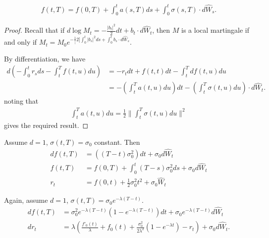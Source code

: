 \begin{remark}
  \begin{align}
    \label{eq:158}
    f(t, T) = f(0, T) + \int_{0}^{t} a(s, T) ds + \int_{0}^{t}
    \sigma(s, T) \cdot d\hat W_{s}.
  \end{align}
\end{remark}

\begin{proof}
  Recall that if $d \log M_{t} = -\frac{|b_{t}|^{2}}{2} dt + b_{t}
  \cdot d \hat W_{t}$, then $M$ is a local martingale if and only if
  $M_{t} = M_{0} e^{-\frac{1}[2] \int_{0}^{t} |b_{s}|^{2} ds +
    \int_{0}^{t} b_{s} \cdot d \hat W_{s}}$.

  By differentiation, we have
  \begin{align}
    \label{eq:159}
    d \left( - \int_{0}^{t} r_{s} ds - \int_{t}^{T} f(t, u) du \right)
    &=
    -r_{t} dt + f(t, t) dt - \int_{t}^{T} df(t, u) du \\
    &= - (\int_{t}^{T} a(t, u) du) dt - (\int_{t}^{T} \sigma(t, u) du)
    \cdot d \hat W_{t}.
  \end{align}
  noting that
  \begin{align}
    \label{eq:160}
    \int_{t}^{T} a(t, u) du = \frac{1}{2} \| \int_{t}^{T} \sigma(t, u)
    du \|^{2} 
  \end{align} gives the required result.
\end{proof}

\begin{exmp}
  \label{defn:bond_markets:8}
  Assume $d = 1$, $\sigma(t, T) = \sigma_{0}$ constant. Then
  \begin{align}
    \label{eq:161}
    df(t, T) &= ((T - t) \sigma_{0}^{2}) dt + \sigma_{0} d \hat W_{t}
    \\
    f(t, T) &= f(0, T) + \int_{0}^{t} (T - s) \sigma_{0}^{2} ds +
    \sigma_{0} d \hat W_{t} \\
    r_{t} &= f(0, t) + \frac{1}{2} \sigma_{0}^{2} t^{2} + \sigma_{0}
    \hat W_{t}
  \end{align}
\end{exmp}

\begin{exmp}
  \label{defn:bond_markets:9}
  Again, assume $d = 1$, $\sigma(t, T) = \sigma_{0} e^{- \lambda(T - t)}$.
  \begin{align}
    \label{eq:162}
    df(t, T) &= \sigma_{0}^{2} e^{-\lambda(T - t)} (1 - e^{- \lambda(T
      - t)}) dt + \sigma_{0} e^{- \lambda (T - t)} d \hat W_{t} \\
    dr_{t} &= \lambda \left( \frac{f'_{0}(t)}{\lambda} + f_{0}(t) +
      \frac{\sigma_{0}^{2}}{2 \lambda^{2}}(1 - e^{-\lambda t}) - r_{t}
    \right) + \sigma_{0} d \hat W_{t}.
  \end{align}
\end{exmp}

